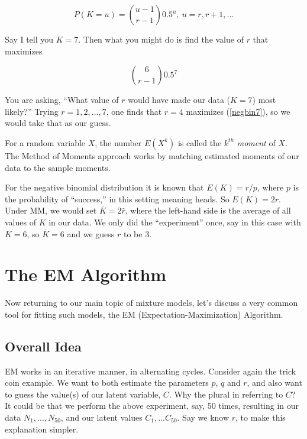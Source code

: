 \begin{equation}
P(K = u) = \binom{u-1}{r-1} 0.5^u,~ u = r, r+1, ...
\end{equation} 

Say I tell you $K = 7$.  Then what you might do is find the value of $r$
that maximizes

\begin{equation}
\label{negbin7}
\binom{6}{r-1} 0.5^7
\end{equation}

You are asking, ``What value of $r$ would have made our data ($K = 7$)
most likely?''  Trying $r = 1,2,...,7$, one finds that $r = 4$ maximizes
(\ref{negbin7}), so we would take that as our guess.

For a random variable $X$, the number $E(X^k)$ is called the $k^{th}$
\textit{moment} of $X$.  The Method of Moments approach works by
matching estimated moments of our data to the sample moments.

For the negative binomial distribution it is known that $E(K) = r/p$,
where $p$ is the probability of ``success,'' in this setting meaning
heads.  So $E(K) = 2r$.  Under MM, we would set $\overline{K} = 2
\widehat{r}$, where the left-hand side is the average of all values of
$K$ in our data.  We only did the ``experiment'' once, say in this case
with $K = 6$, so $\overline{K} = 6$ and we guess $r$ to be 3.

\section{The EM Algorithm}
\label{emalg}

Now returning to our main topic of mixture models, let's discuss a very
common tool for fitting such models, the EM (Expectation-Maximization)
Algorithm.  

\subsection{Overall Idea}

EM works in an iterative manner, in alternating cycles.  Consider again
the trick coin example.  We want to both estimate the parameters $p$,
$q$ and $r$, and also want to guess the value(s) of our latent variable,
$C$.  Why the plural in referring to $C$?  It could be that we perform
the above experiment, say, 50 times, resulting in our data
$N_1,...,N_{50}$, and our latent values $C_1,...C_{50}$.  
Say we know $r$, to make this explanation simpler.

